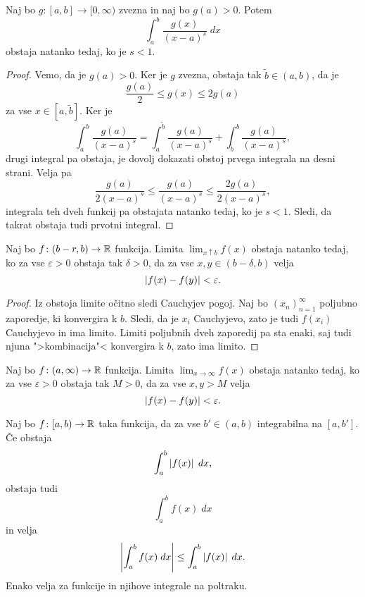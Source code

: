 \documentclass[12pt, a4paper]{article}
\begin{document}
\obvs

\begin{trditev}
Naj bo $g\colon[a,b]\to[0,\infty)$ zvezna in naj bo $g(a)>0$. Potem
\[
\int_a^b \frac{g(x)}{(x-a)^s}\;dx
\]
obstaja natanko tedaj, ko je $s<1$.
\end{trditev}

\begin{proof}
Vemo, da je $g(a)>0$. Ker je $g$ zvezna, obstaja tak $\widetilde{b}\in(a,b)$, da je
\[
\frac{g(a)}{2}\leq g(x)\leq 2g(a)
\]
za vse $x\in[a,\widetilde{b}]$. Ker je
\[
\int_a^b\frac{g(a)}{(x-a)^s}=\int_a^{\widetilde{b}}\frac{g(a)}{(x-a)^s}+\int_{\widetilde{b}}^b\frac{g(a)}{(x-a)^s},
\]
drugi integral pa obstaja, je dovolj dokazati obstoj prvega integrala na desni strani. Velja pa
\[
\frac{g(a)}{2(x-a)^s}\leq\frac{g(a)}{(x-a)^s}\leq\frac{2g(a)}{2(x-a)^s},
\]
integrala teh dveh funkcij pa obstajata natanko tedaj, ko je $s<1$. Sledi, da takrat obstaja tudi prvotni integral.
\end{proof}

\begin{trditev}
Naj bo $f\colon(b-r,b)\to\mathbb{R}$ funkcija. Limita $\displaystyle\lim_{x\uparrow b} f(x)$ obstaja natanko tedaj, ko za vse $\varepsilon>0$ obstaja tak $\delta>0$, da za vse $x,y\in(b-\delta, b)$ velja
\[
\left\lvert f(x)-f(y)\right\rvert<\varepsilon.
\]
\end{trditev}

\begin{proof}
Iz obstoja limite očitno sledi Cauchyjev pogoj. Naj bo $(x_n)_{n=1}^\infty$ poljubno zaporedje, ki konvergira k $b$. Sledi, da je $x_i$ Cauchyjevo, zato je tudi $f(x_i)$ Cauchyjevo in ima limito. Limiti poljubnih dveh zaporedij pa sta enaki, saj tudi njuna ">kombinacija"< konvergira k $b$, zato ima limito.
\end{proof}

\begin{trditev}
Naj bo $f\colon(a,\infty)\to\mathbb{R}$ funkcija. Limita $\displaystyle\lim_{x\to\infty} f(x)$ obstaja natanko tedaj, ko za vse $\varepsilon>0$ obstaja tak $M>0$, da za vse $x,y>M$ velja
\[
\left\lvert f(x)-f(y)\right\rvert<\varepsilon.
\]
\end{trditev}

\begin{trditev}
Naj bo $f\colon[a,b)\to\mathbb{R}$ taka funkcija, da za vse $b'\in(a,b)$ integrabilna na $[a,b']$. Če obstaja
\[
\int_a^b\left\lvert f(x)\right\rvert\;dx,
\]
obstaja tudi
\[
\int_a^b f(x)\;dx
\]
in velja
\[
\left\lvert \int_a^b f(x)\;dx\right\rvert\leq \int_a^b\left\lvert f(x)\right\rvert\;dx.
\]
Enako velja za funkcije in njihove integrale na poltraku.
\end{trditev}
\end{document}
